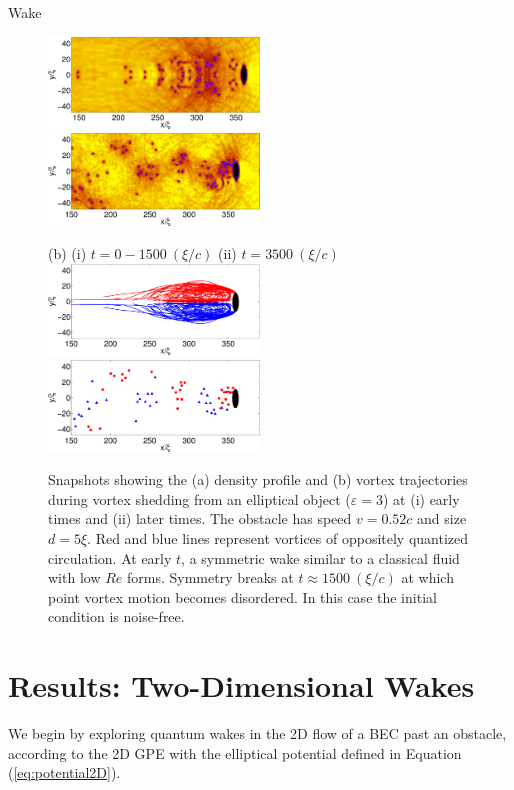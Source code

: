 \begin{chapter}{\label{cha:wake}Wake}
\begin{figure}
\label{fig:dens3}\includegraphics[width=0.5\textwidth]{wake/figure2ai}
\label{fig:dens4}\includegraphics[width=0.5\textwidth]{wake/figure2aii}

\vspace{0.2cm}
(b)\hspace{1.8cm} (i)  $t = 0-1500 ~(\xi/c)$ \hspace{2.4cm} \hspace{1.2cm} (ii)   $t= 3500~ (\xi/c)$
\\
\vspace{0.3cm}
  \includegraphics[width=0.5\textwidth]{wake/figure2bi}
  \includegraphics[width=0.5\textwidth]{wake/figure2bii}
  \caption{Snapshots showing the (a) density profile and (b) vortex trajectories during vortex shedding from an elliptical object ($\varepsilon = 3$) at (i) early times and (ii) later times.  The obstacle has speed $v=0.52c$ and size $d = 5\xi$. Red and blue lines represent vortices of oppositely quantized circulation. At early $t$, a symmetric wake similar to a classical fluid with low $Re$ forms. Symmetry breaks at $t\approx1500~(\xi/c)$ at which point vortex motion becomes disordered. In this case the initial condition is noise-free.}
  \label{fig:denstraj}
\end{figure}
\section{Results: Two-Dimensional Wakes}
We begin by exploring quantum wakes in the 2D flow of a BEC past an obstacle, according to the 2D GPE with the elliptical potential defined in Equation  (\ref{eq:potential2D}).

\end{chapter}

